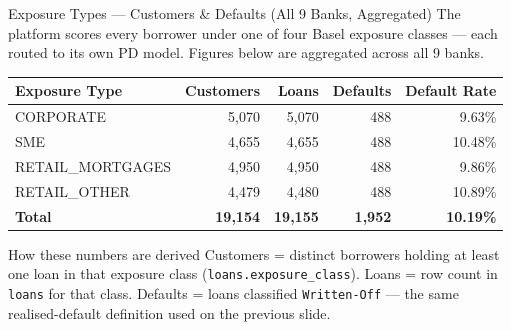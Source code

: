 \documentclass[9pt,aspectratio=169]{beamer}
\begin{document}
\begin{frame}{Exposure Types --- Customers \& Defaults (All 9 Banks, Aggregated)}
\vspace{-2pt}
{\footnotesize The platform scores every borrower under one of four Basel exposure classes ---
each routed to its own PD model. Figures below are aggregated across all 9 banks.}\\[6pt]
\begin{center}
\footnotesize
\setlength{\tabcolsep}{8pt}
\begin{tabular}{lrrrr}
  \toprule
  \textbf{Exposure Type} & \textbf{Customers} & \textbf{Loans} & \textbf{Defaults} & \textbf{Default Rate}\\
  \midrule
  CORPORATE          &  5{,}070 &  5{,}070 &   488 &  9.63\%\\
  SME                &  4{,}655 &  4{,}655 &   488 & 10.48\%\\
  RETAIL\_MORTGAGES  &  4{,}950 &  4{,}950 &   488 &  9.86\%\\
  RETAIL\_OTHER      &  4{,}479 &  4{,}480 &   488 & 10.89\%\\
  \midrule
  \textbf{Total}     & \textbf{19{,}154} & \textbf{19{,}155} & \textbf{1{,}952} & \textbf{10.19\%}\\
  \bottomrule
\end{tabular}
\end{center}
\vspace{6pt}
\begin{alertblock}{How these numbers are derived}
  \footnotesize
  Customers = distinct borrowers holding at least one loan in that exposure class (\texttt{loans.exposure\_class}).
  Loans = row count in \texttt{loans} for that class. Defaults = loans classified \texttt{Written-Off}
  --- the same realised-default definition used on the previous slide.
\end{alertblock}
\end{frame}
\end{document}
